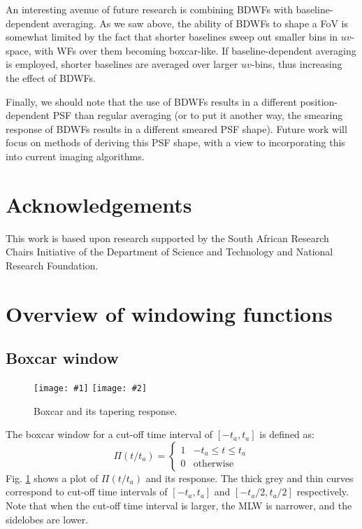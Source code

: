 \documentclass[useAMS,usenatbib]{mn2e}
\begin{document}
An interesting avenue of future research is combining BDWFs with baseline-dependent averaging. As we saw above, the ability
of BDWFs to shape a FoV is somewhat limited by the fact that shorter baselines sweep out smaller bins in $uv$-space, with 
WFs over them becoming boxcar-like. If baseline-dependent averaging is employed, shorter baselines are averaged over
larger $uv$-bins, thus increasing the effect of BDWFs. 

Finally, we should note that the use of BDWFs results in a different position-dependent PSF than regular averaging (or
to put it another way, the smearing response of BDWFs results in a different smeared PSF shape). Future work will focus
on methods of deriving this PSF shape, with a view to incorporating this into current imaging algorithms.


\section*{Acknowledgements}

This work is based upon research supported by the South African Research Chairs Initiative of the Department of 
Science and Technology and National Research Foundation.





\appendix
\section{Overview of windowing functions}
\label{appendixA}
\newcommand{\FilterFigure}[4]{
\begin{figure}
\texttt{[image: \#1]}%
\texttt{[image: \#2]}
\caption{#3}\label{#4}
\end{figure}
}

\subsection{Boxcar window}

\FilterFigure{Figures/boxcargrey.png}{Figures/freq_resp_boxgrey.png}{Boxcar and its tapering response.}{fig:wf:box}

The boxcar window for a cut-off time interval of $[-t_a,t_a]$ is defined as:
\begin{equation}
\Pi(t/t_a)=\left\{
\begin{array}{rl}
1 & \mbox{$-t_a \leq t \leq t_a$} \\
0 & \mbox{otherwise}
\end{array}\right.
\end{equation}
Fig. \ref{fig:wf:box} shows a plot of $\Pi(t/t_a)$ and its response. The thick grey and thin curves 
correspond to cut-off time intervals of $[-t_a, t_a]$ and 
$[-t_a/2,t_a/2]$ respectively. Note that when the cut-off time interval is larger, the MLW is 
narrower, and the sidelobes are lower.
\end{document}
